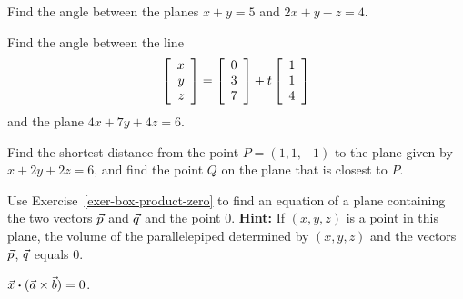 \documentclass{ximera}
\begin{document}
\begin{exercise}
  Find the angle between the planes $x+y=5$ and $2x+y-z=4$.
\end{exercise}

\begin{exercise}
  Find the angle between the line
  \begin{equation*}
    \startmat{r} x \\ y \\ z \stopmat
    = \startmat{r} 0 \\ 3 \\ 7 \stopmat
    + t \startmat{r} 1 \\ 1 \\ 4 \stopmat
  \end{equation*}
  and the plane $4x+7y+4z = 6$.
\end{exercise}

\begin{exercise}
  Find the shortest distance from the point $P = (1,1,-1)$ to the plane
  given by $x + 2y + 2z = 6$, and find the point $Q$ on the plane
  that is closest to $P$.
\end{exercise}

\begin{exercise}
  Use Exercise~\ref{exer-box-product-zero} to find an equation of a
  plane containing the two vectors $\vect{p}$ and $\vect{q}$ and the
  point $0$. \textbf{Hint:} If $(x,y,z)$ is a point in this
  plane, the volume of the parallelepiped determined by $(x,y,z)$
  and the vectors $\vect{p}$, $\vect{q}$ equals 0.
  \begin{solution}
    $\vect{x}\dotprod (\vect{a}\times \vect{b}) =0$.
  \end{solution}
\end{exercise}
\end{document}

